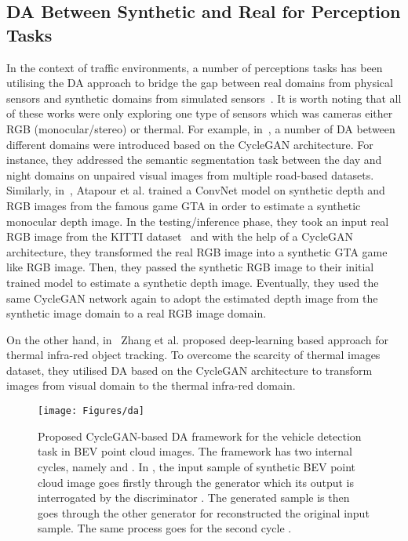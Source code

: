 \documentclass[letterpaper, 10 pt, conference]{IEEEtran}
\begin{document}
\subsection{DA Between Synthetic and Real for Perception Tasks}\label{dgap}
In the context of traffic environments, a number of perceptions tasks has been utilising the DA approach to bridge the gap between real domains from physical sensors and synthetic domains from simulated sensors~\cite{zhu2017unpaired, atapour2018real,zhang2019synthetic}. It is worth noting that all of these works were only exploring one type of sensors which was cameras either RGB (monocular/stereo) or thermal. For example, in~\cite{zhu2017unpaired}, a number of DA between different domains were introduced based on the CycleGAN architecture. For instance, they addressed the semantic segmentation task between the day and night domains on unpaired visual images from multiple road-based datasets. Similarly, in~\cite{atapour2018real}, Atapour et al. trained a ConvNet model on synthetic depth and RGB images from the famous game GTA in order to estimate a synthetic monocular depth image. In the testing/inference phase, they took an input real RGB image from the KITTI dataset~\cite{menze2015object} and with the help of a CycleGAN architecture, they transformed the real RGB image into a synthetic GTA game like RGB image. Then, they passed the synthetic RGB image to their initial trained model to estimate a synthetic depth image. Eventually, they used the same CycleGAN network again to adopt the estimated depth image from the synthetic image domain to a real RGB image domain.

\smallbreak
On the other hand, in~\cite{zhang2019synthetic} Zhang et al. proposed deep-learning based approach for thermal infra-red object tracking. To overcome the scarcity of thermal images dataset, they utilised DA based on the CycleGAN architecture to transform images from visual domain to the thermal infra-red domain. 
	\begin{figure*}[t]
		\centering
		\texttt{[image: Figures/da]}
		\caption{Proposed CycleGAN-based DA framework for the vehicle detection task in BEV point cloud images. The framework has two internal cycles, namely  and . In , the input sample  of synthetic BEV point cloud image goes firstly through the generator  which its output is interrogated by the discriminator . The generated  sample  is then goes through the other generator  for reconstructed the original input  sample. The same process goes for the second cycle .}
		\label{fig:frmwrk}
	\end{figure*}
\end{document}
